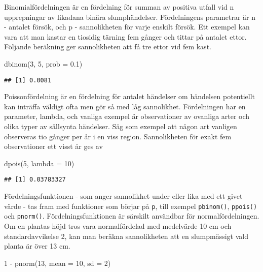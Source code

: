 \documentclass[
]{book}
\newenvironment{Shaded}{\begin{snugshade}}{\end{snugshade}}
\newcommand{\AttributeTok}[1]{\textcolor[rgb]{0.77,0.63,0.00}{#1}}
\newcommand{\DecValTok}[1]{\textcolor[rgb]{0.00,0.00,0.81}{#1}}
\newcommand{\FloatTok}[1]{\textcolor[rgb]{0.00,0.00,0.81}{#1}}
\newcommand{\FunctionTok}[1]{\textcolor[rgb]{0.00,0.00,0.00}{#1}}
\newcommand{\NormalTok}[1]{#1}
\newcommand{\SpecialCharTok}[1]{\textcolor[rgb]{0.00,0.00,0.00}{#1}}
\theoremstyle{definition}
\theoremstyle{definition}
\theoremstyle{definition}
\theoremstyle{definition}
\theoremstyle{remark}
\begin{document}
Binomialfördelningen är en fördelning för summan av positiva utfall vid n upprepningar av likadana binära slumphändelser. Fördelningens parametrar är n - antalet försök, och p - sannolikheten för varje enskilt försök. Ett exempel kan vara att man kastar en tiosidig tärning fem gånger och tittar på antalet ettor. Följande beräkning ger sannolikheten att få tre ettor vid fem kast.

\begin{Shaded}
\begin{Highlighting}[]
\FunctionTok{dbinom}\NormalTok{(}\DecValTok{3}\NormalTok{, }\DecValTok{5}\NormalTok{, }\AttributeTok{prob =} \FloatTok{0.1}\NormalTok{)}
\end{Highlighting}
\end{Shaded}

\begin{verbatim}
## [1] 0.0081
\end{verbatim}

Poissonfördelning är en fördelning för antalet händelser om händelsen potentiellt kan inträffa väldigt ofta men gör så med låg sannolikhet. Fördelningen har en parameter, lambda, och vanliga exempel är observationer av ovanliga arter och olika typer av sällsynta händelser. Säg som exempel att någon art vanligen observeras tio gånger per år i en viss region. Sannolikheten för exakt fem observationer ett visst år ges av

\begin{Shaded}
\begin{Highlighting}[]
\FunctionTok{dpois}\NormalTok{(}\DecValTok{5}\NormalTok{, }\AttributeTok{lambda =} \DecValTok{10}\NormalTok{)}
\end{Highlighting}
\end{Shaded}

\begin{verbatim}
## [1] 0.03783327
\end{verbatim}

Fördelningsfunktionen - som anger sannolikhet under eller lika med ett givet värde - tas fram med funktioner som börjar på \texttt{p}, till exempel \texttt{pbinom()}, \texttt{ppois()} och \texttt{pnorm()}. Fördelningsfunktionen är särskilt användbar för normalfördelningen. Om en plantas höjd tros vara normalfördelad med medelvärde 10 cm och standardavvikelse 2, kan man beräkna sannolikheten att en slumpmässigt vald planta är över 13 cm.

\begin{Shaded}
\begin{Highlighting}[]
\DecValTok{1} \SpecialCharTok{{-}} \FunctionTok{pnorm}\NormalTok{(}\DecValTok{13}\NormalTok{, }\AttributeTok{mean =} \DecValTok{10}\NormalTok{, }\AttributeTok{sd =} \DecValTok{2}\NormalTok{)}
\end{Highlighting}
\end{Shaded}
\end{document}

